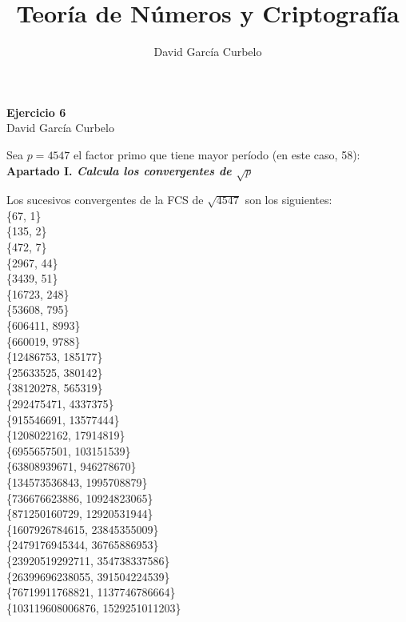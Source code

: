 \documentclass[fleqn]{article}
\author{David García Curbelo}
\title{Teoría de Números y Criptografía}
\begin{document}
    \begin{center}
        \LARGE{\textbf{Ejercicio 6}} \\
        \Large{David García Curbelo} \\
    \end{center}

    \vspace{1cm}
    
    Sea $p = 4547$ el factor primo que tiene mayor período (en este caso, 58): \\ 


    \textbf{Apartado I. \textit{Calcula los convergentes de $\sqrt{p}$}} 

    Los sucesivos convergentes de la FCS de $\sqrt{4547}$ son los siguientes: \\
    \{67, 1\} \\
    \{135, 2\} \\ 
    \{472, 7\} \\ 
    \{2967, 44\} \\ 
    \{3439, 51\} \\ 
    \{16723, 248\} \\ 
    \{53608, 795\} \\ 
    \{606411, 8993\} \\
    \{660019, 9788\} \\ 
    \{12486753, 185177\} \\
    \{25633525, 380142\} \\
    \{38120278, 565319\} \\
    \{292475471, 4337375\} \\
    \{915546691, 13577444\} \\
    \{1208022162, 17914819\} \\
    \{6955657501, 103151539\} \\
    \{63808939671, 946278670\} \\
    \{134573536843, 1995708879\} \\
    \{736676623886, 10924823065\} \\
    \{871250160729, 12920531944\} \\
    \{1607926784615, 23845355009\} \\
    \{2479176945344, 36765886953\} \\
    \{23920519292711, 354738337586\} \\
    \{26399696238055, 391504224539\} \\
    \{76719911768821, 1137746786664\} \\
    \{103119608006876, 1529251011203\} \\
\end{document}
